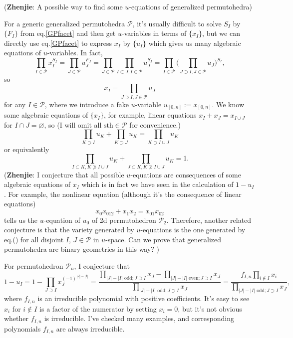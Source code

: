 \documentclass[hidelinks,12pt]{article}
\renewcommand{\theequation}{\thesection.\arabic{equation}}
\renewcommand{\theequation}{\arabic{equation}}
\begin{document}
({\bf Zhenjie}: A possible way to find some $u$-equations of generalized permutohedra)

For a generic generalized permutohedra $\mathscr P$, it's usually difficult to solve $S_I$ by $\{F_I\}$  from eq.\eqref{GPfacet} and then get $u$-variables in terms of $\{x_I\}$, but we can directly use eq.\eqref{GPfacet} to express $x_I$ by $\{u_I\}$ which gives us many algebraic equations of $u$-variables. In fact,
\[
\prod_{I\in \mathscr P}x_I^{S_I}=\prod_{J\in \mathscr P}u_J^{F_J}=\prod_{J\in\mathscr P}\prod_{I\subset J,I\in \mathscr P}u_J^{S_I}=\prod_{I\in\mathscr P}\biggl(\prod_{J\supset I,J\in\mathscr P}u_J\bigg)^{S_I},
\]
so
\begin{equation}
x_I=\prod_{J\supset I,J\in\mathscr P}u_J
\end{equation}
for any $I\in \mathscr P$, where we introduce a fake $u$-variable 
$u_{[0,n]}:=x_{[0,n]}$. We know some algebraic equations of $\{x_I\}$, 
for example, linear equations $x_I+x_J=x_{I\cup J}$ for $I\cap J=\varnothing$, 
so (I will omit all $\text{sth}\in \mathscr P$ for convenience.)
\begin{equation*}
	\prod_{K\supset I}u_K+\prod_{K\supset J}u_K=\prod_{K\supset I\cup J}u_K
\end{equation*}
or equivalently
\begin{equation}
\prod_{I\subset K,K\not\supset I\cup J}u_K +
\prod_{J\subset K,K\not\supset I\cup J}u_K = 1.
\end{equation}
({\bf Zhenjie}: I conjecture that all possible $u$-equations are consequences of 
some algebraic equations of $x_I$ which is in fact we have seen in 
the calculation of $1-u_I$. For example, the nonlinear equation (although it's
the consequence of linear equations)
\[
	x_0x_{012}+x_1x_2=x_{01}x_{02}
\]
tells us the $u$-equation of $u_0$ of 2d permutohedron $\mathscr P_2$. Therefore,
another related conjecture is that the variety generated by $u$-equations 
is the one generated by eq.(\theequation) for all disjoint $I$, $J\in \mathscr P$ 
in $u$-space. Can we prove that generalized permutohedra are binary geometries in
this way?
)

For permutohedron $\mathscr P_n$, I conjecture that
\[
1-u_I=1-\prod_{J\supset I}x_J^{(-1)^{|J|-|I|}}=\frac{\prod_{|J|-|I| \text{ odd}; J\supset I}x_J-\prod_{|J|-|I| \text{ even}; J\supset I}x_J}{\prod_{|J|-|I| \text{ odd}; J\supset I}x_J}
=\frac{f_{I,n}\prod_{i\not\in I}x_i}{\prod_{|J|-|I| \text{ odd}; J\supset I}x_J},
\]
where $f_{I,n}$ is an irreducible polynomial with positive coefficients. It's easy to see $x_i$ for $i\not\in I$ is a factor of the numerator by setting $x_i=0$, but it's not obvious whether $f_{I,n}$ is irreducible. I've checked many examples, and corresponding polynomials $f_{I,n}$ are always irreducible.
\end{document}
